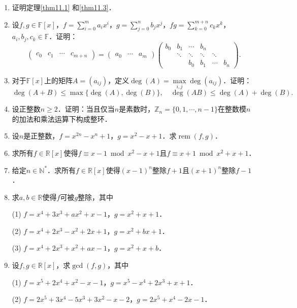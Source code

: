 \documentclass[a4paper,fontset=windows]{ctexbook}
\theoremstyle{definition}
\DeclareMathOperator{\rem}{rem}
\renewcommand{\le}{\leqslant}
\renewcommand{\ge}{\geqslant}
\begin{document}
\begin{enumerate}
\item 证明定理\ref{thm11.1} 和\ref{thm11.3}．

\item 设$f,g\in\mathbb{F}[x]$，$f=\sum\limits_{i=0}^ma_ix^i$，$g=\sum\limits_{j=0}^nb_jx^j$，$fg=\sum\limits_{k=0}^{m+n}c_kx^k$，$a_i,b_j,c_k\in\mathbb{F}$．证明：
$$\begin{pmatrix}c_0&c_1&\cdots&c_{m+n}\end{pmatrix}=\begin{pmatrix}a_0&\cdots&a_m\end{pmatrix}\begin{pmatrix}b_0&b_1&\cdots&b_n&& \\ &\ddots&\ddots&\ddots&\ddots& \\ &&b_0&b_1&\cdots&b_n\end{pmatrix}.$$

\item 对于$\mathbb{F}[x]$上的矩阵$A=(a_{ij})$，定义$\deg(A)=\max\limits_{i,j}\deg(a_{ij})$．证明：
$$\deg(A+B)\le\max\{\deg(A),\deg(B)\},\quad\deg(AB)\le\deg(A)+\deg(B).$$

\item 设正整数$n\ge 2$．证明：当且仅当$n$是素数时，$\mathbb{Z}_n=\{0,1,\cdots,n-1\}$在整数模$n$的加法和乘法运算下构成整环．

\item 设$n$是正整数，$f=x^{2n}-x^n+1$，$g=x^2-x+1$．求$\rem(f,g)$．

\item 求所有$f\in\mathbb{R}[x]$使得$f\equiv x-1\bmod x^2-x+1$且$f\equiv x+1\bmod x^2+x+1$．

\item 给定$n\in\mathbb{N}^*$．求所有$f\in\mathbb{R}[x]$使得$(x-1)^n$整除$f+1$且$(x+1)^n$整除$f-1$．

\item 求$a,b\in\mathbb{R}$使得$f$可被$g$整除，其中

(1) $f=x^4+3x^3+ax^2+x-1$，$g=x^2+x+1$．

(2) $f=x^4+2x^3-x^2+2x+1$，$g=x^2+bx+1$．

(3) $f=x^4+2x^3+x^2+ax-1$，$g=x^2+x+b$．

\item 设$f,g\in\mathbb{R}[x]$，求$\gcd(f,g)$，其中

(1) $f=x^5+2x^4+x^2-x-1$，$g=x^5-x^4+2x^3+x+1$．

(2) $f=2x^5+3x^4-5x^3+3x^2-x-2$，$g=2x^5+x^4-2x-1$．


\end{enumerate}
\end{document}
